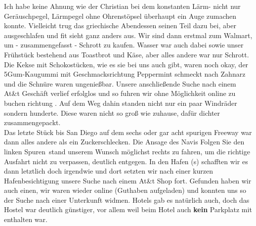 Ich habe keine Ahnung wie der Christian bei dem konstanten Lärm- nicht nur Geräuschpegel, Lärmpegel ohne Ohrenstöpsel überhaupt ein Auge zumachen konnte.
Vielleicht trug das griechische Abendessen seinen Teil dazu bei, aber ausgeschlafen und fit sieht ganz anders aus.
Wir sind dann erstmal zum Walmart, um - zusammengefasst - Schrott zu kaufen.
Wasser war auch dabei sowie unser Frühstück bestehend aus Toastbrot und Käse, aber alles andere war nur Schrott.
Die Kekse mit Schokostücken, wie es sie bei uns auch gibt, waren noch okay, der 5Gum-Kaugummi mit Geschmacksrichtung Peppermint schmeckt nach Zahnarz und die Schnüre waren ungenießbar.
Unsere anschließende Suche nach einem At\&t Geschäft verlief erfolglos und so fuhren wir ohne Möglichkeit online zu buchen richtung .
Auf dem Weg dahin standen nicht nur ein paar Windräder sondern hunderte.
Diese waren nicht so groß wie zuhause, dafür dichter zusammengepackt.\\


Das letzte Stück bis San Diego auf dem sechs oder gar acht spurigen Freeway war dann alles andere als ein Zuckerschlecken.
Die Ansage des Navis \flqq Folgen Sie den linken Spuren\frqq \, stand unserem Wunsch möglichst rechts zu fahren, um die richtige Ausfahrt nicht zu verpassen, deutlich entgegen.
In den Hafen (s) schafften wir es dann letztlich doch irgendwie und dort setzten wir nach einer kurzen Hafenbesichtigung unsere Suche nach einem At\&t Shop fort.
Gefunden haben wir auch einen, wir waren wieder online (Guthaben aufgeladen) und konnten uns so der Suche nach einer Unterkunft widmen.
Hotels gab es natürlich auch, doch das Hostel war deutlich günstiger, vor allem weil beim Hotel auch \textbf{kein} Parkplatz mit enthalten war.


